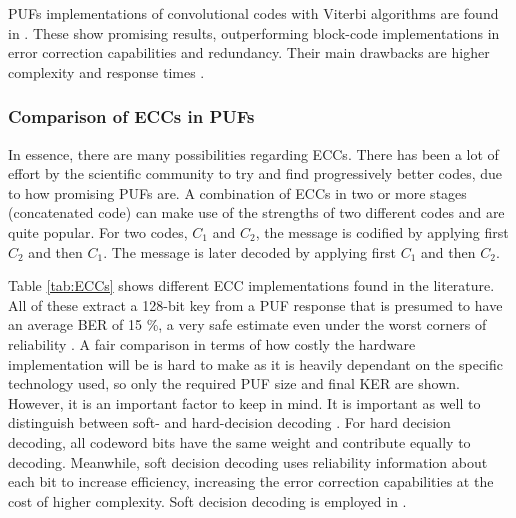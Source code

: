 PUFs implementations of convolutional codes with Viterbi algorithms are found in \cite{Hiller2013,Hiller2014}. These show promising results, outperforming block-code implementations in error correction capabilities and redundancy. Their main drawbacks are higher complexity and response times \cite{Hiller2013}. 

\subsubsection{Comparison of ECCs in PUFs}

In essence, there are many possibilities regarding ECCs. There has been a lot of effort by the scientific community to try and find progressively better codes, due to how promising PUFs are. A combination of ECCs in two or more stages (concatenated code) can make use of the strengths of two different codes \cite{Bohm2013,Bosch2008} and are quite popular. For two codes, $C_1$ and $C_2$, the message is codified by applying first $C_2$ and then $C_1$. The message is later decoded by applying first $C_1$ and then $C_2$.

Table \ref{tab:ECCs} shows different ECC implementations found in the literature. All of these extract a 128-bit key from a PUF response that is presumed to have an average BER of 15 \%, a very safe estimate even under the worst corners of reliability \cite{Maes2009}.   A fair comparison in terms of how costly the hardware implementation will be is hard to make as it is heavily dependant on the specific technology used, so only the required PUF size and final KER are shown. However, it is an important factor to keep in mind. It is important as well to distinguish between soft- and hard-decision decoding \cite{Hiller2013}. For hard decision decoding, all codeword bits have the same weight and contribute equally to decoding. Meanwhile, soft decision decoding uses reliability information about each bit to increase efficiency, increasing the error correction capabilities at the cost of higher complexity. Soft decision decoding is employed in \cite{Maes2009,VanDerLeest2012soft}.

